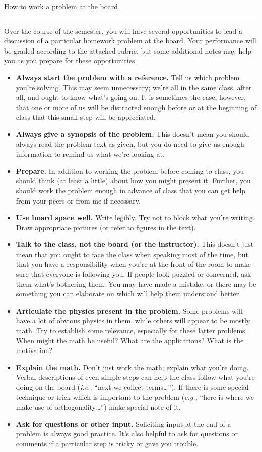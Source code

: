 \documentclass{article}
\begin{document}
\centerline{\Large How to work a problem at the board}
\vskip0.1cm\hrule\vskip0.5cm

Over the course of the semester, you will have several opportunities
to lead a discussion of a particular homework problem at the board.
Your performance will be graded according to the attached rubric, but
some additional notes may help you as you prepare for these
opportunities.

\begin{itemize}
\item {\bf Always start the problem with a reference.}  Tell us which
  problem you're solving.  This may seem unnecessary; we're all in the
  same class, after all, and ought to know what's going on.  It is
  sometimes the case, however, that one or more of us will be
  distracted enough before or at the beginning of class that this
  small step will be appreciated.
\item {\bf Always give a synopsis of the problem.}  This doesn't
  mean you should always read the problem text as given, but
  you do need to give us enough information to remind us what
  we're looking at.
\item {\bf Prepare.}  In addition to working the problem before coming
  to class, you should think (at least a little) about how you might
  present it.  Further, you should work the problem enough in advance
  of class that you can get help from your peers or from me if
  necessary.
\item {\bf Use board space well.}  Write legibly.  Try not to block
  what you're writing.  Draw appropriate pictures (or refer to figures
  in the text).
\item {\bf Talk to the class, not the board (or the instructor).} This
  doesn't just mean that you ought to face the class when speaking
  most of the time, but that you have a responsibility when you're at
  the front of the room to make sure that everyone is following you.
  If people look puzzled or concerned, ask them what's bothering them.
  You may have made a mistake, or there may be something you can
  elaborate on which will help them understand better.
\item {\bf Articulate the physics present in the problem.}  Some
  problems will have a lot of obvious physics in them, while others
  will appear to be mostly math.  Try to establish some relevance,
  especially for these latter problems.  When might the math be
  useful?  What are the applications?  What is the motivation?
\item {\bf Explain the math.}  Don't just work the math; explain what
  you're doing.  Verbal descriptions of even simple steps can help the
  class follow what you're doing on the board ({\it i.e.,} ``next we
  collect terms\ldots'').  If there is some special technique or trick
  which is important to the problem ({\it e.g.,} ``here is where we
  make use of orthogonality\ldots'') make special note of it.
\item {\bf Ask for questions or other input.}  Soliciting input at the
  end of a problem is always good practice.  It's also helpful to ask
  for questions or comments if a particular step is tricky or gave you
  trouble.
\end{itemize}
\end{document}
